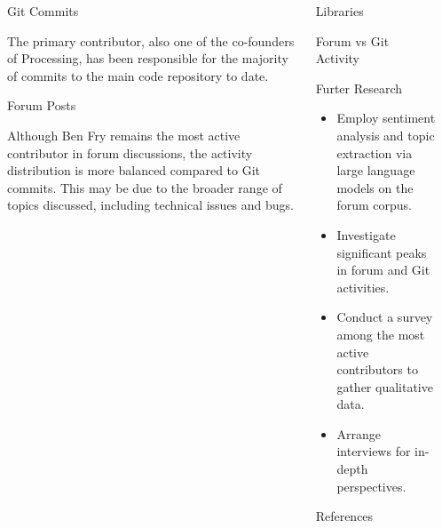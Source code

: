 \documentclass[final]{beamer}
\begin{document}
\begin{frame}[t]
\begin{columns}[t]
\begin{column}{.32\textwidth}
    \end{column}
    \begin{column}{.32\textwidth}
      \begin{block}{Git Commits}
        
        The primary contributor, also one of the co-founders of Processing, has been responsible for the majority of commits to the main code repository to date.
      \end{block}
      \begin{block}{Forum Posts}
        
        Although Ben Fry remains the most active contributor in forum discussions, the activity distribution is more balanced compared to Git commits. This may be due to the broader range of topics discussed, including technical issues and bugs.
      \end{block}
    \end{column}
    
    \begin{column}{.32\textwidth}
      \begin{block}{Libraries}
        

      \end{block}
      \begin{block}{Forum vs Git Activity}
        
      \end{block}
      \begin{block}{Furter Research}
        \begin{itemize}
          \item Employ sentiment analysis and topic extraction via large language models on the forum corpus.
          \item Investigate significant peaks in forum and Git activities.
          \item Conduct a survey among the most active contributors to gather qualitative data.
          \item Arrange interviews for in-depth perspectives.
        \end{itemize}
      \end{block}

      \begin{block}{References}
        \printbibliography
      \end{block} 
    \end{column}
    
  \end{columns}
\end{frame}
\end{document}
